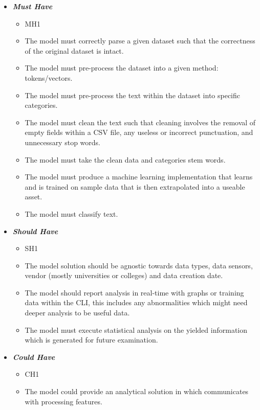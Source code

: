 \begin{itemize}
    \item \textbf{\textit{Must Have}}
        \begin{itemize}\label{FMH}
            \item MH1
            \item The model must correctly parse a given dataset such that the correctness of the original dataset is intact.
            \item The model must pre-process the dataset into a given method: tokens/vectors.
            \item The model must pre-process the text within the dataset into specific categories.
            \item The model must clean the text such that cleaning involves the removal of empty fields within a CSV file, any useless or incorrect punctuation, and unnecessary stop words.
            \item The model must take the clean data and categories stem words.
            \item The model must produce a machine learning implementation that learns and is trained on sample data that is then extrapolated into a useable asset.
            \item The model must classify text.
        \end{itemize}
    \item \textbf{\textit{Should Have}}
        \begin{itemize}\label{FSH}
            \item SH1
            \item The model solution should be agnostic towards data types, data sensors, vendor (mostly universities or colleges) and data creation date.
            \item The model should report analysis in real-time with graphs or training data within the CLI, this includes any abnormalities which might need deeper analysis to be useful data.
            \item The model must execute statistical analysis on the yielded information which is generated for future examination.
        \end{itemize}
    \item \textbf{\textit{Could Have}}
        \begin{itemize}\label{FCH}
            \item CH1
            \item The model could provide an analytical solution in which communicates with processing features.

\end{itemize}
\end{itemize}
